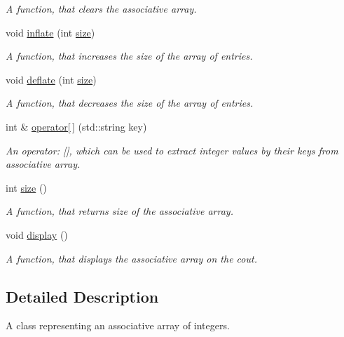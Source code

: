 \begin{DoxyCompactItemize}
\begin{DoxyCompactList}\small\item\em A function, that clears the associative array. \end{DoxyCompactList}\item 
void \hyperlink{class_assoc_array_a074a811629c29414dfb172f8ed4273e6}{inflate} (int \hyperlink{class_assoc_array_af41e83fc4ee21d2b795c9eab765f45e0}{size})
\begin{DoxyCompactList}\small\item\em A function, that increases the size of the array of entries. \end{DoxyCompactList}\item 
void \hyperlink{class_assoc_array_a0d0c725df30b35a2e05c3cdc2ce2eccb}{deflate} (int \hyperlink{class_assoc_array_af41e83fc4ee21d2b795c9eab765f45e0}{size})
\begin{DoxyCompactList}\small\item\em A function, that decreases the size of the array of entries. \end{DoxyCompactList}\item 
int \& \hyperlink{class_assoc_array_a707ed0e095cc7d9c80d3619c6c693da3}{operator\mbox{[}$\,$\mbox{]}} (std\-::string key)
\begin{DoxyCompactList}\small\item\em An operator\-: \mbox{[}\mbox{]}, which can be used to extract integer values by their keys from associative array. \end{DoxyCompactList}\item 
int \hyperlink{class_assoc_array_af41e83fc4ee21d2b795c9eab765f45e0}{size} ()
\begin{DoxyCompactList}\small\item\em A function, that returns size of the associative array. \end{DoxyCompactList}\item 
\hypertarget{class_assoc_array_a64800d2ae59a4a305eb9062a48429a09}{void \hyperlink{class_assoc_array_a64800d2ae59a4a305eb9062a48429a09}{display} ()}\label{class_assoc_array_a64800d2ae59a4a305eb9062a48429a09}

\begin{DoxyCompactList}\small\item\em A function, that displays the associative array on the cout. \end{DoxyCompactList}\end{DoxyCompactItemize}


\subsection{Detailed Description}
A class representing an associative array of integers. 

